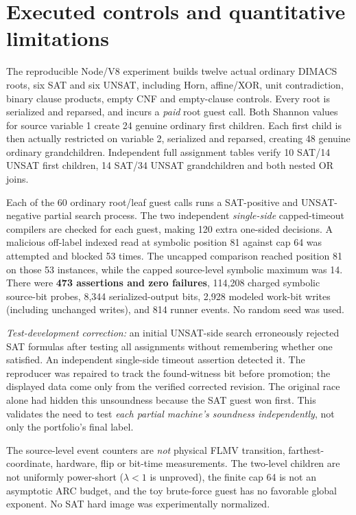 \documentclass[11pt]{article}
\begin{document}
\section{Executed controls and quantitative limitations}
The reproducible Node/V8 experiment builds twelve actual
ordinary DIMACS roots, six SAT and six UNSAT, including
Horn, affine/XOR, unit contradiction, binary clause products,
empty CNF and empty-clause controls. Every root is serialized
and reparsed, and incurs a \emph{paid} root guest call.
Both Shannon values for source variable 1 create 24 genuine
ordinary first children. Each first child is then actually
restricted on variable 2, serialized and reparsed, creating
48 genuine ordinary grandchildren. Independent full
assignment tables verify 10 SAT/14 UNSAT first children,
14 SAT/34 UNSAT grandchildren and both nested OR joins.

Each of the 60 ordinary root/leaf guest calls runs a
SAT-positive and UNSAT-negative partial search process.
The two independent \emph{single-side} capped-timeout
compilers are checked for each guest, making 120 extra
one-sided decisions. A malicious off-label indexed read
at symbolic position 81 against cap 64 was attempted and
blocked 53 times. The uncapped comparison reached position
81 on those 53 instances, while the capped source-level
symbolic maximum was 14. There were \textbf{473 assertions
and zero failures}, 114,208 charged symbolic source-bit
probes, 8,344 serialized-output bits, 2,928 modeled work-bit
writes (including unchanged writes), and 814 runner events.
No random seed was used.

\emph{Test-development correction:} an initial UNSAT-side
search erroneously rejected SAT formulas after testing all
assignments without remembering whether one satisfied.
An independent single-side timeout assertion detected it.
The reproducer was repaired to track the found-witness bit
before promotion; the displayed data come only from the
verified corrected revision. The original race alone had
hidden this unsoundness because the SAT guest won first.
This validates the need to test \emph{each partial machine's
soundness independently}, not only the portfolio's final label.

The source-level event counters are \emph{not} physical
FLMV transition, farthest-coordinate, hardware, flip or
bit-time measurements. The two-level children are not
uniformly power-short ($\lambda<1$ is unproved), the
finite cap 64 is not an asymptotic ARC budget, and the
toy brute-force guest has no favorable global exponent.
No SAT hard image was experimentally normalized.
\end{document}
